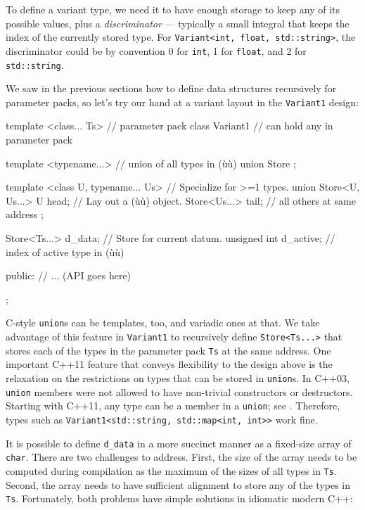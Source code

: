 To define a variant type, we need it to have enough storage to keep any
of its possible values, plus a \emph{discriminator} --- typically a
small integral that keeps the index of the currently stored type. For
\lstinline!Variant<int,!~\lstinline!float,!~\lstinline!std::string>!, the
discriminator could be by convention 0 for \lstinline!int!, 1 for
\lstinline!float!, and 2 for \lstinline!std::string!.

We saw in the previous sections how to define data structures
recursively for parameter packs, so let's try our hand at a variant
layout in the \lstinline!Variant1! design:

\begin{emcppslisting}
template <class... Ts>                      // parameter pack
class Variant1                              // can hold any in parameter pack
{
    template <typename...>                  // union of all types in (ù{}ù)
    union Store {};

    template <class U, typename... Us>      // Specialize for >=1 types.
    union Store<U, Us...>
    {
        U head;                             // Lay out a (ù{}ù) object.
        Store<Us...> tail;                  // all others at same address
    };

    Store<Ts...> d_data;                    // Store for current datum.
    unsigned int d_active;                  // index of active type in (ù{}ù)

public:
    // ... (API goes here)
};
\end{emcppslisting}
    

\noindent C-style \lstinline!union!s can be templates, too, and variadic ones at
that. We take advantage of this feature in \lstinline!Variant1! to
recursively define \lstinline!Store<Ts...>! that stores each of the types
in the parameter pack \lstinline!Ts! at the same address. One important
C++11 feature that conveys flexibility to the design above is the
relaxation on the restrictions on types that can be stored in
\lstinline!union!s. In C++03, \lstinline!union! members were not allowed to
have non-trivial constructors or destructors. Starting with C++11, any
type can be a member in a \lstinline!union!; see . Therefore, types such as\linebreak%
\lstinline!Variant1<std::string,!~\lstinline!std::map<int,!~\lstinline!int>>!
work fine.

It is possible to define \lstinline!d_data! in a more succinct manner as a
fixed-size array of \lstinline!char!. There are two challenges to address.
First, the size of the array needs to be computed during compilation as
the maximum of the sizes of all types in \lstinline!Ts!. Second, the array
needs to have sufficient alignment to store any of the types in
\lstinline!Ts!. Fortunately, both problems have simple solutions in
idiomatic modern C++:

